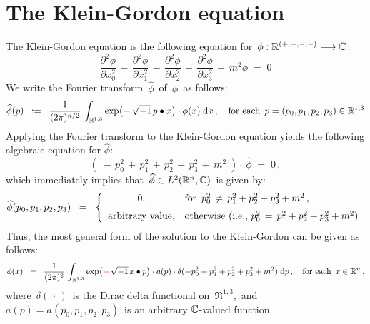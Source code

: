 
\vskip 1.0cm
\section{The Klein-Gordon equation}

\noindent
The Klein-Gordon equation is the following equation
for \,$\phi : \mathbb{R}^{(+,-,-,-)} \longrightarrow \mathbb{C}$:
\begin{equation*}
\dfrac{\partial^{2}\phi}{\partial x_{0}^{2}}
\,-\,
\dfrac{\partial^{2}\phi}{\partial x_{1}^{2}}
\,-\,
\dfrac{\partial^{2}\phi}{\partial x_{2}^{2}}
\,-\,
\dfrac{\partial^{2}\phi}{\partial x_{3}^{2}}
\,+\,
m^{2}\phi
\; = \;
0
\end{equation*}
We write the Fourier transform \,$\widehat{\phi}$\, of \,$\phi$\, as follows:
\begin{equation*}
\widehat{\phi}(p)
\;\; := \;\;
	\dfrac{1}{(2\pi)^{n/2}}\,
	\int_{\Re^{1,3}}
		\exp\!\left({\color{red}-}\,\sqrt{-1}\, p \overset{{\color{white}.}}{\bullet} x\right) \cdot \phi(x)
		\;\d x\,,
\quad
\textnormal{for each \,$p = (p_{0},p_{1},p_{2},p_{3}) \in \Re^{1,3}$}
\end{equation*}
Applying the Fourier transform to the Klein-Gordon equation yields
the following algebraic equation for $\widehat{\phi}$:
\begin{equation*}
\left(\;
	-\,
	p_{0}^{2}
	\,+\,
	p_{1}^{2}
	\,+\,
	p_{2}^{2}
	\,+\,
	p_{3}^{2}
	\,+\,
	m^{2}
	\;\right)
	\cdot\,\widehat{\phi}
\; = \;
	0\,,
\end{equation*}
which immediately implies that \,$\widehat{\phi} \in L^{2}(\mathbb{R}^{n},\mathbb{C})$\, is given by:
\begin{equation*}
\widehat{\phi}(p_{0},p_{1},p_{2},p_{3})
\;\; = \;\;
	\left\{\begin{array}{cl}
		0, & \textnormal{for \,$p_{0}^{2} \,\neq\, p_{1}^{2} + p_{2}^{2} + p_{3}^{2} + m^{2}$}\,,
		\\
		\overset{{\color{white}1}}{\textnormal{arbitrary value}}, & \textnormal{otherwise (i.e., $p_{0}^{2} \,=\, p_{1}^{2} + p_{2}^{2} + p_{3}^{2} + m^{2}$)}
		\end{array}\right.
\end{equation*}
Thus, the most general form of the solution to the Klein-Gordon can be given as follows:
\begin{equation*}
\phi(x)
\;\; = \;\;
	\dfrac{1}{(2\pi)^{2}}\,
	\int_{\Re^{1,3}}
		\exp\!\left({\color{red}+}\,\sqrt{-1}\, x \overset{{\color{white}.}}{\bullet} p\right)
		\cdot
		a(p)
		\cdot
		\delta(-p_{0}^{2} + p_{1}^{2} + p_{2}^{2} + p_{3}^{2} + m^{2})
		\;\d p\,,
\quad
\textnormal{for each \,$x \in \Re^{n}$}\,,
\end{equation*}
where
\,$\delta(\,\cdot\,)$\, is the Dirac delta functional on \,$\Re^{1,3}$,\, and
\,$a(p) = a(p_{0},p_{1},p_{2},p_{3})$\, is an arbitrary $\mathbb{C}$-valued function.

